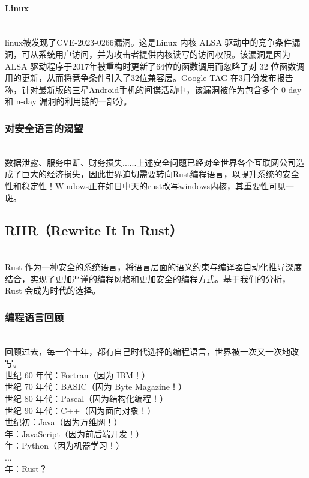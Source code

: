 \documentclass{ctexart}
\begin{document}
\paragraph{Linux}\ \\
\indent linux被发现了CVE-2023-0266漏洞。这是Linux 内核 ALSA 驱动中的竞争条件漏洞，可从系统用户访问，并为攻击者提供内核读写的访问权限。该漏洞是因为 ALSA 驱动程序于2017年被重构时更新了64位的函数调用而忽略了对 32 位函数调用的更新，从而将竞争条件引入了32位兼容层。Google TAG 在3月份发布报告称，针对最新版的三星Android手机的间谍活动中，该漏洞被作为包含多个 0-day 和 n-day 漏洞的利用链的一部分。
\subsubsection{对安全语言的渴望}\ \\
\indent 数据泄露、服务中断、财务损失......上述安全问题已经对全世界各个互联网公司造成了巨大的经济损失，因此世界迫切需要转向Rust编程语言，以提升系统的安全性和稳定性！Windows正在如日中天的rust改写windows内核，其重要性可见一斑。
\subsection{RIIR（Rewrite It In Rust）}\ \\
Rust 作为一种安全的系统语言，将语言层面的语义约束与编译器自动化推导深度结合，实现了更加严谨的编程风格和更加安全的编程方式。基于我们的分析，Rust 会成为时代的选择。
\subsubsection{编程语言回顾}\ \\
\indent 回顾过去，每一个十年，都有自己时代选择的编程语言，世界被一次又一次地改写。\\
 世纪 60 年代：Fortran（因为 IBM！）\\
 世纪 70 年代：BASIC（因为 Byte Magazine！） \\
 世纪 80 年代：Pascal（因为结构化编程！） \\
 世纪 90 年代：C++（因为面向对象！） \\
 世纪初：Java（因为万维网！） \\
 年：JavaScript（因为前后端开发！） \\
 年：Python（因为机器学习！） \\
\indent ... \\
 年：Rust？
\end{document}
